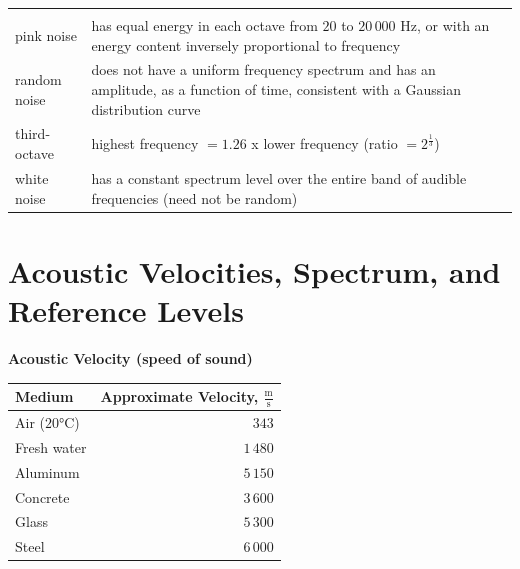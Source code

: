 \documentclass[
]{book}
\begin{document}
\begin{longtable}[]{@{}ll@{}}
\begin{minipage}[t]{0.73\columnwidth}
\end{minipage}\tabularnewline
\begin{minipage}[t]{0.21\columnwidth}\raggedright
pink noise\strut
\end{minipage} & \begin{minipage}[t]{0.73\columnwidth}\raggedright
has equal energy in each octave from \(20\) to \(20\,000\) Hz, or with an energy content inversely proportional to frequency\strut
\end{minipage}\tabularnewline
\begin{minipage}[t]{0.21\columnwidth}\raggedright
random noise\strut
\end{minipage} & \begin{minipage}[t]{0.73\columnwidth}\raggedright
does not have a uniform frequency spectrum and has an amplitude, as a function of time, consistent with a Gaussian distribution curve\strut
\end{minipage}\tabularnewline
\begin{minipage}[t]{0.21\columnwidth}\raggedright
third-octave\strut
\end{minipage} & \begin{minipage}[t]{0.73\columnwidth}\raggedright
highest frequency \(= 1.26\) x lower frequency (ratio \(= 2^{\frac{1}{3}}\))\strut
\end{minipage}\tabularnewline
\begin{minipage}[t]{0.21\columnwidth}\raggedright
white noise\strut
\end{minipage} & \begin{minipage}[t]{0.73\columnwidth}\raggedright
has a constant spectrum level over the entire band of audible frequencies (need not be random)\strut
\end{minipage}\tabularnewline
\bottomrule
\end{longtable}

\hypertarget{acoustic-velocities-spectrum-and-reference-levels}{%
\section{Acoustic Velocities, Spectrum, and Reference Levels}\label{acoustic-velocities-spectrum-and-reference-levels}}

\textbf{Acoustic Velocity (speed of sound)}

\begin{longtable}[]{@{}lr@{}}
\toprule
Medium & Approximate Velocity, \(\frac{\text{m}}{\text{s}}\)\tabularnewline
\midrule
\endhead
Air (\(20° \text{C}\)) & \(343\)\tabularnewline
Fresh water & \(1\,480\)\tabularnewline
Aluminum & \(5\,150\)\tabularnewline
Concrete & \(3\,600\)\tabularnewline
Glass & \(5\,300\)\tabularnewline
Steel & \(6\,000\)\tabularnewline
\bottomrule
\end{longtable}
\end{document}
